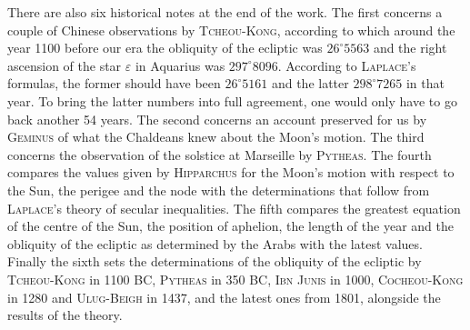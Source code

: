 There are also six historical notes at the end of the work. The first concerns a couple of Chinese observations by \textsc{Tcheou-Kong}, according to which around the year 1100 before our era the obliquity of the ecliptic was $26^{\circ}5563$ and the right ascension of the star $\varepsilon$ in Aquarius was $297^{\circ}8096$. According to \textsc{Laplace}’s formulas, the former should have been $26^{\circ}5161$ and the latter $298^{\circ}7265$ in that year. To bring the latter numbers into full agreement, one would only have to go back another 54 years. The second concerns an account preserved for us by \textsc{Geminus} of what the Chaldeans knew about the Moon’s motion. The third concerns the observation of the solstice at Marseille by \textsc{Pytheas}. The fourth compares the values given by \textsc{Hipparchus} for the Moon’s motion with respect to the Sun, the perigee and the node with the determinations that follow from \textsc{Laplace}’s theory of secular inequalities. The fifth compares the greatest equation of the centre of the Sun, the position of aphelion, the length of the year and the obliquity of the ecliptic as determined by the Arabs with the latest values. Finally the sixth sets the determinations of the obliquity of the ecliptic by \textsc{Tcheou-Kong} in 1100 BC, \textsc{Pytheas} in 350 BC, \textsc{Ibn Junis} in 1000, \textsc{Cocheou-Kong} in 1280 and \textsc{Ulug-Beigh} in 1437, and the latest ones from 1801, alongside the results of the theory.
